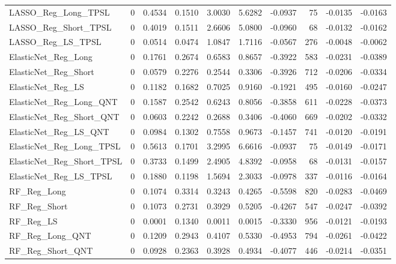 \begin{tabular}{llrrrrrrrr}
\cline{1-10}
LASSO\_Reg\_Long\_TPSL & 0 & 0.4534 & 0.1510 & 3.0030 & 5.6282 & -0.0937 & 75 & -0.0135 & -0.0163 \\
\cline{1-10}
LASSO\_Reg\_Short\_TPSL & 0 & 0.4019 & 0.1511 & 2.6606 & 5.0800 & -0.0960 & 68 & -0.0132 & -0.0162 \\
\cline{1-10}
LASSO\_Reg\_LS\_TPSL & 0 & 0.0514 & 0.0474 & 1.0847 & 1.7116 & -0.0567 & 276 & -0.0048 & -0.0062 \\
\cline{1-10}
ElasticNet\_Reg\_Long & 0 & 0.1761 & 0.2674 & 0.6583 & 0.8657 & -0.3922 & 583 & -0.0231 & -0.0389 \\
\cline{1-10}
ElasticNet\_Reg\_Short & 0 & 0.0579 & 0.2276 & 0.2544 & 0.3306 & -0.3926 & 712 & -0.0206 & -0.0334 \\
\cline{1-10}
ElasticNet\_Reg\_LS & 0 & 0.1182 & 0.1682 & 0.7025 & 0.9160 & -0.1921 & 495 & -0.0160 & -0.0247 \\
\cline{1-10}
ElasticNet\_Reg\_Long\_QNT & 0 & 0.1587 & 0.2542 & 0.6243 & 0.8056 & -0.3858 & 611 & -0.0228 & -0.0373 \\
\cline{1-10}
ElasticNet\_Reg\_Short\_QNT & 0 & 0.0603 & 0.2242 & 0.2688 & 0.3406 & -0.4060 & 669 & -0.0202 & -0.0332 \\
\cline{1-10}
ElasticNet\_Reg\_LS\_QNT & 0 & 0.0984 & 0.1302 & 0.7558 & 0.9673 & -0.1457 & 741 & -0.0120 & -0.0191 \\
\cline{1-10}
ElasticNet\_Reg\_Long\_TPSL & 0 & 0.5613 & 0.1701 & 3.2995 & 6.6616 & -0.0937 & 75 & -0.0149 & -0.0171 \\
\cline{1-10}
ElasticNet\_Reg\_Short\_TPSL & 0 & 0.3733 & 0.1499 & 2.4905 & 4.8392 & -0.0958 & 68 & -0.0131 & -0.0157 \\
\cline{1-10}
ElasticNet\_Reg\_LS\_TPSL & 0 & 0.1880 & 0.1198 & 1.5694 & 2.3033 & -0.0978 & 337 & -0.0116 & -0.0164 \\
\cline{1-10}
RF\_Reg\_Long & 0 & 0.1074 & 0.3314 & 0.3243 & 0.4265 & -0.5598 & 820 & -0.0283 & -0.0469 \\
\cline{1-10}
RF\_Reg\_Short & 0 & 0.1073 & 0.2731 & 0.3929 & 0.5205 & -0.4267 & 547 & -0.0247 & -0.0392 \\
\cline{1-10}
RF\_Reg\_LS & 0 & 0.0001 & 0.1340 & 0.0011 & 0.0015 & -0.3330 & 956 & -0.0121 & -0.0193 \\
\cline{1-10}
RF\_Reg\_Long\_QNT & 0 & 0.1209 & 0.2943 & 0.4107 & 0.5330 & -0.4953 & 794 & -0.0261 & -0.0422 \\
\cline{1-10}
RF\_Reg\_Short\_QNT & 0 & 0.0928 & 0.2363 & 0.3928 & 0.4934 & -0.4077 & 446 & -0.0214 & -0.0351 \\

\end{tabular}
